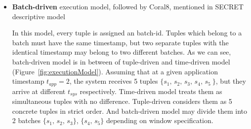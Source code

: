 \begin{itemize}
	\item \textbf{Batch-driven} execution model, followed by Coral8, mentioned in SECRET\citep{Botan:2010} descriptive model 
	
	
In this model, every tuple is assigned an batch-id. Tuples which belong to a batch must have the same timestamp, but two separate tuples with the identical timestamp may belong to two different batches. As we can see, batch-driven model is in between of tuple-driven and time-driven model (Figure~\ref{fig:executionModel}). Assuming that at a given application timestamp $t_{app} = 2$, the system receives 5 tuples $\{s_1,\,s_2,\,s_3,\,s_4,\,s_5\>\}$,  but they arrive at different $t_{sys}$ respectively. Time-driven model treats them as simultaneous tuples with no difference. Tuple-driven considers them as 5 concrete tuples in strict order. And batch-driven model may divide them into 2 batches $\{s_1,\,s_2,\,s_3\}$, $\{s_4,\,s_5\}$ depending on window specification.




\end{itemize}
